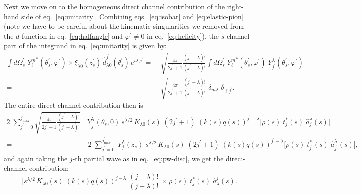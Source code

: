\documentclass[10pt, aps,prd,amsmath,amssymb,superscriptaddress,onecolumn,
nofootinbib,showpacs,preprintnumbers]{revtex4-1}
\newcommand{\jpmax}{{j^\prime_\text{max}}}
\begin{document}
Next we move on to the homogeneous direct channel contribution of the right-hand side of eq.~\ref{eq:unitarity}. Combining eqs.~\ref{eq:isobar} and \ref{eq:elastic-pion} (note we have to be careful about the kinematic singularities we removed from the \(d\)-function in eq.~\ref{eq:halfangle} and \(\varphi^\prime \not= 0\) in eq.~\ref{eq:helicity}), the \(s\)-channel part of the integrand in eq.~\ref{eq:unitarity} is given by:
  \begin{align}
      \label{eq:direct-channel-angle}
     \int d\Omega_s^\prime \; {Y^m_\ell}^*(\theta_s^\prime, \varphi^\prime) \times \xi_{\lambda0}(z_s^\prime) \, \hat{d}_{\lambda0}^{j^\prime}(\theta_s^\prime) \, e^{i\lambda \varphi^\prime} =&
     \; \sqrt{\frac{4\pi}{2j^\prime+1}\frac{(j^\prime+\lambda)!}{(j^\prime-\lambda)!}} \int d\Omega_s^\prime \; {Y^m_\ell}^*(\theta_s^\prime, \varphi^\prime) \;  Y^\lambda_{j^\prime}(\theta_s^\prime, \varphi^\prime) \nonumber \\
    =& \;  \sqrt{\frac{4\pi}{2j^\prime+1}\frac{(j^\prime+\lambda)!}{(j^\prime-\lambda)!}} \;  \delta_{m\lambda} \; \delta_{\ell j^\prime}.
  \end{align}
The entire direct-channel contribution then is
  \begin{align}
    2 \; \sum_{j^\prime=0}^\jpmax \sqrt{\frac{4\pi}{2j^\prime+1}\frac{(j^\prime+\lambda)!}{(j^\prime-\lambda)!}}& \, {Y^\lambda_{j^\prime}}(\theta_s,0) \; s^{\lambda/2} \, K_{\lambda 0}(s) \; (2j^\prime +1) \; (k(s)q(s))^{j^\prime - \lambda}
    \bigg[\rho(s) \; t^*_j(s) \; \hat{a}^\lambda_j(s) \bigg ] \nonumber \\
    =& \;  2\;  \sum_{j^\prime=0}^\jpmax \; P^\lambda_j(z_s) \; s^{\lambda/2} \, K_{\lambda 0}(s) \; (2j^\prime +1) \; (k(s)q(s))^{j^\prime - \lambda}
    \bigg[\rho(s) \; t^*_{j^\prime}(s) \; \hat{a}^\lambda_{j^\prime}(s) \bigg ],
  \end{align}
and again taking the \(j\)-th partial wave as in eq.~\ref{eq:pw-disc}, we get the direct-channel contribution:
  \begin{equation}
    \label{eq:pw-direct}
   \bigg[ s^{\lambda/2} \, K_{\lambda 0}(s) \; (k(s)q(s))^{j - \lambda} \; \frac{(j+\lambda)!}{(j- \lambda)!} \bigg] \times \rho(s) \; t^*_j(s) \; \hat{a}_\lambda^j(s).
  \end{equation}
\end{document}
